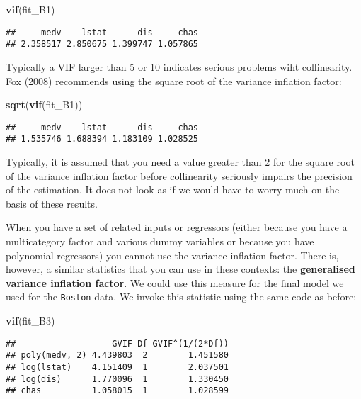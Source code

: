 \documentclass[
]{book}
\newenvironment{Shaded}{\begin{snugshade}}{\end{snugshade}}
\newcommand{\FunctionTok}[1]{\textcolor[rgb]{0.13,0.29,0.53}{\textbf{#1}}}
\newcommand{\NormalTok}[1]{#1}
\begin{document}
\begin{Shaded}
\begin{Highlighting}[]
\FunctionTok{vif}\NormalTok{(fit\_B1)}
\end{Highlighting}
\end{Shaded}

\begin{verbatim}
##     medv    lstat      dis     chas 
## 2.358517 2.850675 1.399747 1.057865
\end{verbatim}

Typically a VIF larger than 5 or 10 indicates serious problems wiht collinearity. Fox (2008) recommends using the square root of the variance inflation factor:

\begin{Shaded}
\begin{Highlighting}[]
\FunctionTok{sqrt}\NormalTok{(}\FunctionTok{vif}\NormalTok{(fit\_B1))}
\end{Highlighting}
\end{Shaded}

\begin{verbatim}
##     medv    lstat      dis     chas 
## 1.535746 1.688394 1.183109 1.028525
\end{verbatim}

Typically, it is assumed that you need a value greater than 2 for the square root of the variance inflation factor before collinearity seriously impairs the precision of the estimation. It does not look as if we would have to worry much on the basis of these results.

When you have a set of related inputs or regressors (either because you have a multicategory factor and various dummy variables or because you have polynomial regressors) you cannot use the variance inflation factor. There is, however, a similar statistics that you can use in these contexts: the \textbf{generalised variance inflation factor}. We could use this measure for the final model we used for the \texttt{Boston} data. We invoke this statistic using the same code as before:

\begin{Shaded}
\begin{Highlighting}[]
\FunctionTok{vif}\NormalTok{(fit\_B3)}
\end{Highlighting}
\end{Shaded}

\begin{verbatim}
##                   GVIF Df GVIF^(1/(2*Df))
## poly(medv, 2) 4.439803  2        1.451580
## log(lstat)    4.151409  1        2.037501
## log(dis)      1.770096  1        1.330450
## chas          1.058015  1        1.028599
\end{verbatim}
\end{document}
